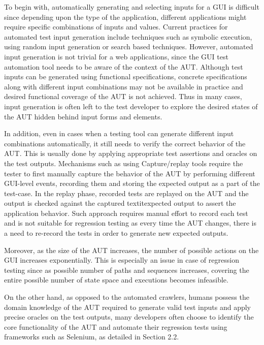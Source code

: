 To begin with, automatically generating and selecting inputs for a GUI is difficult since depending upon the type of the application, different applications might require specific combinations of inputs and values. 
Current practices for automated test input generation include techniques such as symbolic execution\cite{Ganovetal}, using random input generation\cite{godefroid2005dart} or search based techniques\cite{gross2012search}. However, automated input generation is not trivial for a web applications, since the GUI test automation tool needs to be aware of the context of the AUT. Although test inputs can be generated using functional specifications, concrete specifications along with different input combinations may not be available in practice and desired functional coverage of the AUT is not achieved. Thus in many cases, input generation is often left to the test developer to explore the desired states of the AUT hidden behind input forms and elements.

In addition, even in cases when a testing tool can generate different input combinations automatically, it still needs to verify the correct behavior of the AUT. This is usually done by applying appropriate test assertions and oracles on the test outputs\cite{Baresi:Oracles}. Mechanisms such as using Capture/replay tools\cite{joshi2006capture} require the tester to first manually capture the behavior of the AUT by performing different GUI-level events, recording them and storing the expected output as a part of the test-case. In the replay phase, recorded tests are replayed on the AUT and the output is checked against the captured textit{expected output} to assert the application behavior. Such approach requires manual effort to record each test and is not suitable for regression testing as every time the AUT changes, there is a need to re-record the tests in order to generate new expected outputs. 

Moreover, as the size of the AUT increases, the number of possible actions on the GUI increases exponentially. This is especially an issue in case of regression testing since as possible number of paths and sequences increases, covering the entire possible number of state space and executions becomes infeasible.

On the other hand, as opposed to the automated crawlers, humans possess the domain knowledge of the AUT required to generate valid test inputs and apply precise oracles on the test outputs, many developers often choose to identify the core functionality of the AUT and automate their regression tests using frameworks such as Selenium, as detailed in Section 2.2.

